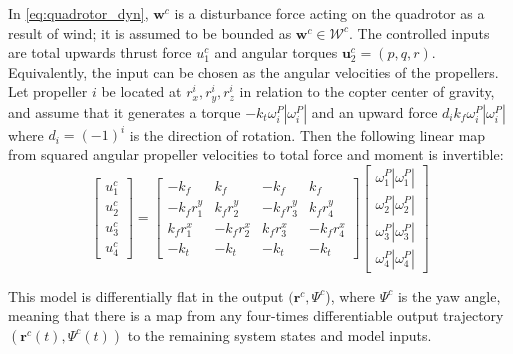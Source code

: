 \documentclass[conference]{IEEEtran}
\begin{document}
In \eqref{eq:quadrotor_dyn}, $\mathbf{w}^c$ is a disturbance force acting on the quadrotor as a result of wind; it is assumed to be bounded as $\mathbf{w}^c \in \mathcal W^c$. The controlled inputs are total upwards thrust force $u_1^c$ and angular torques $\mathbf{u}^c_2 = (p,q,r)$. Equivalently, the input can be chosen as the angular velocities of the propellers. Let propeller $i$ be located at $r_x^i, r_y^i, r_z^i$ in relation to the copter center of gravity, and assume that it generates a torque $- k_t \omega_i^P |\omega_i^P|$ and an upward force $d_i k_f \omega_i^P |\omega_i^P|$ where $d_i = (-1)^i$ is the direction of rotation. Then the following linear map from squared angular propeller velocities to total force and moment is invertible:
\begin{equation}
\begin{bmatrix}
  u_1^c \\
  u_2^c \\
  u_3^c \\
  u_4^c
\end{bmatrix} =
\begin{bmatrix}
  -k_f  & k_f& -k_f&  k_f \\
    -k_f r_1^y &   k_f r_2^y &  -k_f r_3^y &   k_f r_4^y \\
     k_f r_1^x &  -k_f r_2^x &   k_f r_3^x  & -k_f r_4^x \\
     -k_t  &     -k_t    &   -k_t       & -k_t
\end{bmatrix}
\begin{bmatrix}
  \omega^P_1 |\omega^P_1| \\
  \omega^P_2 |\omega^P_2| \\
  \omega^P_3 |\omega^P_3| \\
  \omega^P_4 |\omega^P_4|
\end{bmatrix}
\end{equation}

This model is differentially flat in the output $(\mathbf{r}^c, \Psi^c$), where $\Psi^c$ is the yaw angle, meaning that there is a map from any four-times differentiable output trajectory $(\mathbf{r}^c(t), \Psi^c(t))$ to the remaining system states and model inputs.
\end{document}

